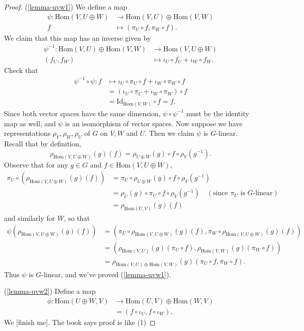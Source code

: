 \begin{proof}
(\ref{lemma-uvw1}) We define a map
\begin{align*}
 \psi \colon \text{Hom}(V, U \oplus W) &\to \text{Hom}(V,U) \oplus \text{Hom}(V,W) \\
 f  &\mapsto (\pi_U \circ f, \pi_W \circ f). 
\end{align*}
We claim that this map has an inverse	given by 
\begin{align*}
 \psi^{-1} \colon \text{Hom}(V,U) \oplus \text{Hom}(V,W) &\to \text{Hom}(V, U \oplus W) \\
 (f_U ,f_W) &\mapsto \iota_U \circ f_U + \iota_W \circ f_W.
\end{align*}
Check that
\begin{align*}
\psi^{-1} \circ \psi \colon f &\mapsto \iota_U \circ \pi_U \circ f + \iota_W \circ \pi_W \circ f \\
&= (\iota_U \circ \pi_U + \iota_W \circ \pi_W) \circ f\\
&= \text{Id}_{\text{Hom}(V,W)} \circ f = f.
\end{align*}
Since both vector spaces have the same dimension, $\psi \circ \psi^{-1}$ must be the identity map as well, and $\psi$ is an isomorphism of vector spaces.  Now suppose we have representations $\rho_V, \rho_W, \rho_U$ of $G$ on $V, W$ and $U$.  Then we claim $\psi$ is $G$-linear.  Recall that by definition, 
\[ \rho_{\text{Hom}(V, U \oplus W)}(g)(f) = \rho_{U \oplus W} (g) \circ f \circ \rho_V (g^{-1}).\]
Observe that for any $g \in G$ and  $f \in \text{Hom}(V, U \oplus W)$,
\begin{align*}
 \pi_U \circ ( \rho_{\text{Hom}(V, U \oplus W)}(g)(f) )&= \pi_U \circ \rho_{U \oplus W} (g) \circ f \circ \rho_V (g^{-1}) \\
 &= \rho_U (g) \circ \pi_U  \circ f \circ \rho_V (g^{-1}) \quad (\text{since } \pi_U \text{ is }G\text{-linear}) \\
 &=\rho_{\text{Hom}(U,V)}(g)(f)
 \end{align*}
 and similarly for $W$, so that 
 \begin{align*}
\psi ( \rho_{\text{Hom}(V, U \oplus W)}(g)(f)) &= (\pi_U \circ \rho_{\text{Hom}(V, U \oplus W)}(g)(f), \pi_W \circ \rho_{\text{Hom}(V,U \oplus W)}(g)(f)) \\
&=(\rho_{\text{Hom}(V,U)}(g)(\pi_U \circ f), \rho_{\text{Hom}(V,W)}(g)(\pi_W \circ f)) \\
&= \rho_{\text{Hom}(V,U) \oplus \text{Hom}(V,W)}(g)(\pi_U \circ f, \pi_W \circ f).
 \end{align*}
Thus $\psi$ is $G$-linear, and we've proved (\ref{lemma-uvw1}).

(\ref{lemma-uvw2})  Define a map
\begin{align*}
\phi \colon \text{Hom}(U \oplus W, V) &\to \text{Hom}(U,V) \oplus \text{Hom}(W,V) \\
&= (f \circ \iota_U, f \circ \iota_W).
\end{align*}
We [finish me].  The book says proof is like (1)
\end{proof}

